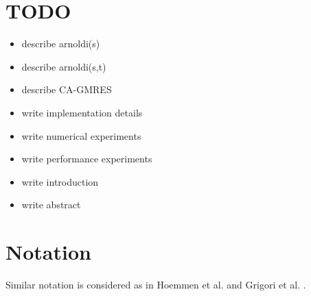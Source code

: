 \documentclass{scrartcl}
\numberwithin{equation}{section}
\begin{document}
\pagebreak

\tableofcontents

\pagebreak
\section{TODO}
\begin{itemize}
\item describe arnoldi(s)
\item describe arnoldi(s,t)
\item describe CA-GMRES
\item write implementation details
\item write numerical experiments
\item write performance experiments
\item write introduction
\item write abstract
\end{itemize}

\pagebreak
\section{Notation}
Similar notation is considered as in Hoemmen et al. \cite{Hoemmen:2010:CKS:1970638} and Grigori et al. \cite{Grigori}.
\end{document}
